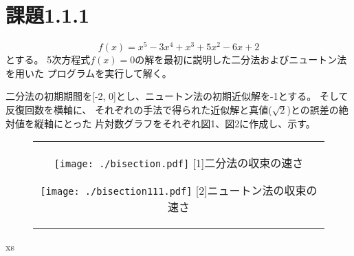 \documentclass[uplatex, dvipdfmx, 11pt,a4j, titlepage]{jsarticle}
\begin{document}
\section{課題1.1.1}
\begin{equation}
    f(x) = x^5 - 3 x^4 + x^3 + 5 x^2 - 6x + 2 
\end{equation}
とする。
5次方程式$f(x) = 0$の解を最初に説明した二分法およびニュートン法を用いた
プログラムを実行して解く。


二分法の初期期間を[-2, 0]とし、ニュートン法の初期近似解を-1とする。
そして反復回数を横軸に、
それぞれの手法で得られた近似解と真値($\sqrt{2}$)との誤差の絶対値を縦軸にとった
片対数グラフをそれぞれ図1、図2に作成し、示す。



\begin{figure}[htpb]
    \begin{center}
        \begin{tabular}{c}

            \begin{minipage}{0.33\hsize}
                \begin{center}
                    \texttt{[image: ./bisection.pdf]}
                    \hspace{1.6cm} [1]二分法の収束の速さ
                \end{center}
            \end{minipage}

            \begin{minipage}{0.33\hsize}
                \begin{center}
                    \texttt{[image: ./bisection111.pdf]}
                    \hspace{1.6cm} [2]ニュートン法の収束の速さ
                \end{center}
            \end{minipage}
            
        \end{tabular}
    \end{center}
\end{figure}


xs



\end{document}
